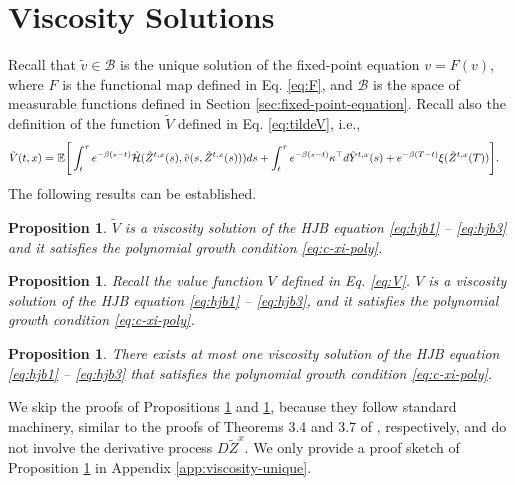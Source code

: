 \documentclass[11pt]{article}
\theoremstyle{definition}
\theoremstyle{plain}
\newtheorem{proposition}[assumption]{Proposition}
\newcommand{\cH}{{\cal H}}
\begin{document}
\section{Viscosity Solutions}\label{sec:viscosity-solutions}
Recall that $\tilde{v} \in \mathcal{B}$ is the unique solution of the fixed-point equation $v = F(v)$, 
where $F$ is the functional map defined in Eq. \eqref{eq:F}, 
and $\mathcal{B}$ is the space of measurable functions defined in Section \ref{sec:fixed-point-equation}.
Recall also the definition of the function $\tilde{V}$ defined in Eq. \eqref{eq:tildeV}, i.e.,
\begin{align*}
\tilde{V}(t,x) =&~\mathbb{E} \Bigg[ \int_t^{\tau} e^{-\beta(s - t)} \tilde \cH(\tilde Z^{t,x}(s), \tilde{v}(s, \tilde Z^{t,x}(s))) ds
+ \int_t^{\tau} e^{-\beta(s - t)} \kappa^{\top} d\tilde Y^{t,x}(s) + e^{-\beta(T - t)} \xi(\tilde Z^{t,x}(T)) \Bigg].
\end{align*}
The following results can be established. 
\begin{proposition}\label{prop:viscosity-tildeV}
$\tilde{V}$ is a viscosity solution of the HJB equation \eqref{eq:hjb1} -- \eqref{eq:hjb3} 
and it satisfies the polynomial growth condition \eqref{eq:c-xi-poly}. 
\end{proposition}
\begin{proposition}\label{prop:viscosity-V}
Recall the value function $V$ defined in Eq. \eqref{eq:V}. 
$V$ is a viscosity solution of the HJB equation \eqref{eq:hjb1} -- \eqref{eq:hjb3}, 
and it satisfies the polynomial growth condition \eqref{eq:c-xi-poly}. 
\end{proposition}
\begin{proposition}\label{prop:viscosity-unique}
There exists at most one viscosity solution of the HJB equation \eqref{eq:hjb1} -- \eqref{eq:hjb3} 
that satisfies the polynomial growth condition \eqref{eq:c-xi-poly}.
\end{proposition}
We skip the proofs of Propositions \ref{prop:viscosity-V} and \ref{prop:viscosity-unique}, 
because they follow standard machinery, similar to the proofs of Theorems 3.4 and 3.7 of \cite{borkar2004ergodic}, respectively, 
and do not involve the derivative process $D\tilde Z^x$. 
We only provide a proof sketch of Proposition \ref{prop:viscosity-unique} in Appendix \ref{app:viscosity-unique}.
\end{document}
